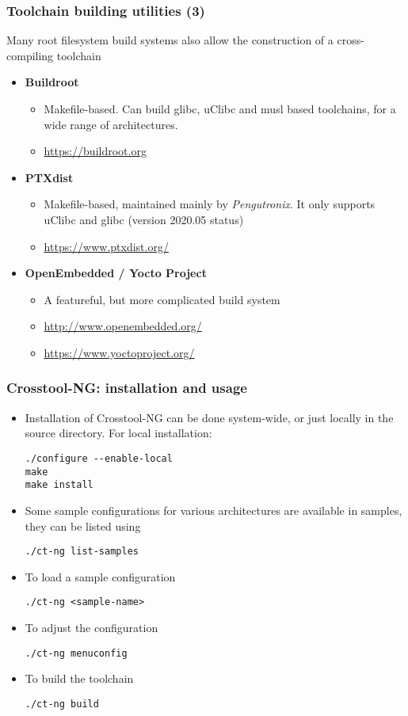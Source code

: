 \begin{frame}
\frametitle{Toolchain building utilities (3)}
Many root filesystem build systems also allow the construction of
a cross-compiling toolchain
\begin{itemize}
\item {\bf Buildroot}
  \begin{itemize}
  \item Makefile-based. Can build glibc, uClibc and musl based
    toolchains, for a wide range of architectures.
  \item \url{https://buildroot.org}
  \end{itemize}
\item {\bf PTXdist}
  \begin{itemize}
  \item Makefile-based, maintained mainly by {\em Pengutronix}. It only
        supports uClibc and glibc (version 2020.05 status)
  \item \url{https://www.ptxdist.org/}
  \end{itemize}
\item {\bf OpenEmbedded / Yocto Project}
  \begin{itemize}
  \item A featureful, but more complicated build system
  \item \url{http://www.openembedded.org/}
  \item \url{https://www.yoctoproject.org/}
  \end{itemize}
\end{itemize}
\end{frame}

\begin{frame}[fragile]
  \frametitle{Crosstool-NG: installation and usage}
  \begin{itemize}
  \item Installation of Crosstool-NG can be done system-wide, or just locally in
    the source directory. For local installation:
\begin{verbatim}
./configure --enable-local
make
make install
\end{verbatim}
  \item Some sample configurations for various architectures are
    available in
    samples, they can be listed using
\begin{verbatim}
./ct-ng list-samples
\end{verbatim}
  \item To load a sample configuration
\begin{verbatim}
./ct-ng <sample-name>
\end{verbatim}
  \item To adjust the configuration
\begin{verbatim}
./ct-ng menuconfig
\end{verbatim}
  \item To build the toolchain
\begin{verbatim}
./ct-ng build
\end{verbatim}
  \end{itemize}
\end{frame}

